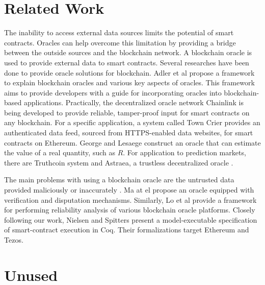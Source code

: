 \documentclass[a4paper]{llncs}
\begin{document}
\section{Related Work}
\label{sec:related work}
The inability to access external data sources limits the potential of
smart contracts. Oracles
\cite{oracle-patterns,call-action-oracle,oracles-study} can help
overcome this limitation by providing a bridge between the outside
sources and the blockchain network. A blockchain oracle is used to
provide external data to smart contracts. Several researches have been
done to provide oracle solutions for blockchain. Adler et al
\cite{blockchain-oracles} propose a framework to explain blockchain
oracles and various key aspects of oracles. This framework aims to
provide developers with a guide for incorporating oracles into
blockchain-based applications. Practically, the decentralized oracle
network Chainlink \cite{chainlink-whitepaper} is being developed to
provide reliable, tamper-proof input for smart contracts on any
blockchain. For a specific application, a system called Town Crier
\cite{town-crier} provides an authenticated data feed, sourced from
HTTPS-enabled data websites, for smart contracts on Ethereum. George
and Lesaege \cite{oracle-real-value} construct an oracle that can
estimate the value of a real quantity, such as $R$.  
For application to prediction markets, there are Truthcoin system
\cite{truthcoin-whitepaper} and Astraea, a trustless decentralized
oracle \cite{astraea}.   

The main problems with using a blockchain oracle are the untrusted
data provided maliciously or inaccurately \cite{trustworthy}. Ma at el
\cite{reliable-oracle} propose an oracle equipped with 
verification and disputation mechanisms. Similarly, Lo et al
\cite{reliablity-oracles} provide a framework for performing
reliability analysis of various blockchain oracle platforms. Closely
following our work, Nielsen and Spitters \cite{interact-coq} present a
model-executable specification of smart-contract execution in
Coq. Their formalizations target Ethereum and Tezos.  

\newpage{}




\newpage{}
\appendix

\section{Unused}
\label{sec:unused}
\end{document}
